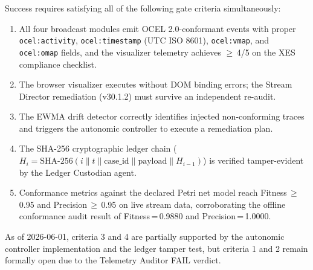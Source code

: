 Success requires satisfying all of the following gate criteria simultaneously:
\begin{enumerate}
  \item All four broadcast modules emit OCEL 2.0-conformant events with proper
    \texttt{ocel:activity}, \texttt{ocel:timestamp} (UTC ISO 8601),
    \texttt{ocel:vmap}, and \texttt{ocel:omap} fields, and the visualizer telemetry
    achieves $\geq$\,4/5 on the XES compliance checklist.
  \item The browser visualizer executes without DOM binding errors; the Stream
    Director remediation (v30.1.2) must survive an independent re-audit.
  \item The EWMA drift detector correctly identifies injected non-conforming traces
    and triggers the autonomic controller to execute a remediation plan.
  \item The SHA-256 cryptographic ledger chain ($H_i = \text{SHA-256}(i \| t \|
    \text{case\_id} \| \text{payload} \| H_{i-1})$) is verified tamper-evident
    by the Ledger Custodian agent.
  \item Conformance metrics against the declared Petri net model reach
    Fitness\,$\geq$\,0.95 and Precision\,$\geq$\,0.95 on live stream data,
    corroborating the offline conformance audit result of Fitness\,=\,0.9880
    and Precision\,=\,1.0000.
\end{enumerate}

As of 2026-06-01, criteria 3 and 4 are partially supported by the autonomic
controller implementation and the ledger tamper test, but criteria 1 and 2 remain
formally open due to the Telemetry Auditor FAIL verdict.
